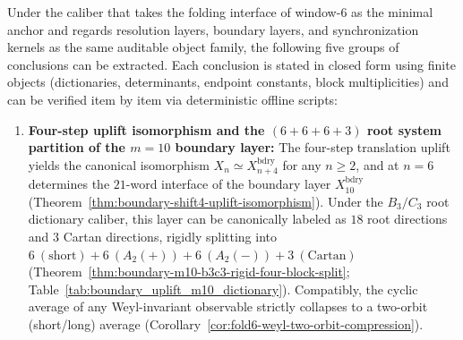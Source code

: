 \begin{theorem}\label{thm:window6-unified-skeleton}
Under the caliber that takes the folding interface of window-\(6\) as the minimal anchor and regards resolution layers, boundary layers, and synchronization kernels as the same auditable object family, the following five groups of conclusions can be extracted. Each conclusion is stated in closed form using finite objects (dictionaries, determinants, endpoint constants, block multiplicities) and can be verified item by item via deterministic offline scripts:
\begin{enumerate}
  \item \textbf{Four-step uplift isomorphism and the \texorpdfstring{$(6+6+6+3)$}{(6+6+6+3)} root system partition of the \(m=10\) boundary layer:}
  The four-step translation uplift yields the canonical isomorphism \(X_n\simeq X_{n+4}^{\mathrm{bdry}}\) for any \(n\ge 2\), and at \(n=6\) determines the \(21\)-word interface of the boundary layer \(X_{10}^{\mathrm{bdry}}\) (Theorem~\ref{thm:boundary-shift4-uplift-isomorphism}).
  Under the \(B_3/C_3\) root dictionary caliber, this layer can be canonically labeled as \(18\) root directions and \(3\) Cartan directions, rigidly splitting into
  \(
  6\ (\mathrm{short})+6\ (A_2(+))+6\ (A_2(-))+3\ (\mathrm{Cartan})
  \)
  (Theorem~\ref{thm:boundary-m10-b3c3-rigid-four-block-split}; Table~\ref{tab:boundary_uplift_m10_dictionary}).
  Compatibly, the cyclic average of any Weyl-invariant observable strictly collapses to a two-orbit (short/long) average (Corollary~\ref{cor:fold6-weyl-two-orbit-compression}).


\end{enumerate}
\end{theorem}
